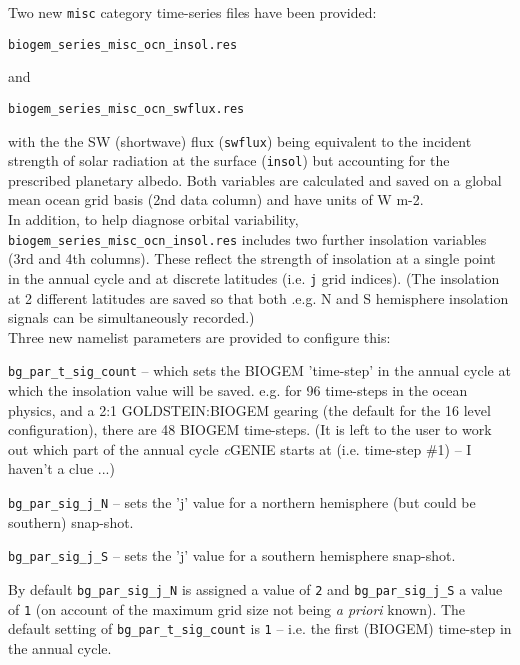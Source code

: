 \documentclass[10pt,twoside]{article}
\begin{document}
Two new \texttt{misc} category time-series files have been provided:
\vspace{-10pt}\begin{verbatim}biogem_series_misc_ocn_insol.res\end{verbatim}\vspace{-10pt}
and
\vspace{-10pt}\begin{verbatim}biogem_series_misc_ocn_swflux.res\end{verbatim}\vspace{-10pt}
with the the SW (shortwave) flux (\texttt{swflux}) being equivalent to the incident strength of solar radiation at the surface (\texttt{insol}) but accounting for the prescribed planetary albedo. Both variables are calculated and saved on a global mean ocean grid basis (2nd data column) and have units of W m-2.
\\In addition, to help diagnose orbital variability, \texttt{biogem\_series\_misc\_ocn\_insol.res} includes two further insolation variables (3rd and 4th columns). These reflect the strength of insolation at a single point in the annual cycle and at discrete latitudes (i.e. \texttt{j} grid indices). (The insolation at 2 different latitudes are saved so that both .e.g. N and S hemisphere insolation signals can be simultaneously recorded.)
\\Three new namelist parameters are provided to configure this:
\begin{compactenum}
        \item \texttt{bg\_par\_t\_sig\_count} -- which sets the BIOGEM 'time-step' in the annual cycle at which the insolation value will be saved. e.g. for 96 time-steps in the ocean physics, and a 2:1 GOLDSTEIN:BIOGEM gearing (the default for the 16 level configuration), there are 48 BIOGEM time-steps. (It is left to the user to work out which part of the annual cycle \textit{c}GENIE starts at (i.e. time-step \#1) -- I haven't a clue ...)
        \item \texttt{bg\_par\_sig\_j\_N} -- sets the 'j' value for a northern hemisphere (but could be southern) snap-shot.
        \item \texttt{bg\_par\_sig\_j\_S} -- sets the 'j' value for a southern hemisphere snap-shot.
\end{compactenum}
By default \texttt{bg\_par\_sig\_j\_N} is assigned a value of \texttt{2} and \texttt{bg\_par\_sig\_j\_S} a value of \texttt{1} (on account of the maximum grid size not being \textit{a priori} known).
The default setting of \texttt{bg\_par\_t\_sig\_count} is \texttt{1} -- i.e. the first (BIOGEM) time-step in the annual cycle.
\end{document}
